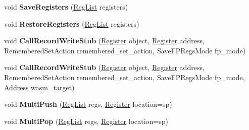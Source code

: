 \begin{DoxyCompactItemize}
\item 
\mbox{\label{classv8_1_1internal_1_1TurboAssembler_adb2676d473b8bdff1c6856758eabfa71}} 
void {\bfseries Save\+Registers} (\mbox{\hyperlink{classuint32__t}{Reg\+List}} registers)
\item 
\mbox{\label{classv8_1_1internal_1_1TurboAssembler_a1ff5e6044d8b7223b66061f3ed4123f1}} 
void {\bfseries Restore\+Registers} (\mbox{\hyperlink{classuint32__t}{Reg\+List}} registers)
\item 
\mbox{\label{classv8_1_1internal_1_1TurboAssembler_ab10280acd4d7aebd053a430cbea68fb1}} 
void {\bfseries Call\+Record\+Write\+Stub} (\mbox{\hyperlink{classv8_1_1internal_1_1Register}{Register}} object, \mbox{\hyperlink{classv8_1_1internal_1_1Register}{Register}} address, Remembered\+Set\+Action remembered\+\_\+set\+\_\+action, Save\+F\+P\+Regs\+Mode fp\+\_\+mode)
\item 
\mbox{\label{classv8_1_1internal_1_1TurboAssembler_a2bc1271b1999cb2ee3784489515931b6}} 
void {\bfseries Call\+Record\+Write\+Stub} (\mbox{\hyperlink{classv8_1_1internal_1_1Register}{Register}} object, \mbox{\hyperlink{classv8_1_1internal_1_1Register}{Register}} address, Remembered\+Set\+Action remembered\+\_\+set\+\_\+action, Save\+F\+P\+Regs\+Mode fp\+\_\+mode, \mbox{\hyperlink{classuintptr__t}{Address}} wasm\+\_\+target)
\item 
\mbox{\label{classv8_1_1internal_1_1TurboAssembler_a9de5c47049739b97a60dd316fb39fed6}} 
void {\bfseries Multi\+Push} (\mbox{\hyperlink{classuint32__t}{Reg\+List}} regs, \mbox{\hyperlink{classv8_1_1internal_1_1Register}{Register}} location=sp)
\item 
\mbox{\label{classv8_1_1internal_1_1TurboAssembler_a8013d77ea3081712f3d2e818a6fb47ed}} 
void {\bfseries Multi\+Pop} (\mbox{\hyperlink{classuint32__t}{Reg\+List}} regs, \mbox{\hyperlink{classv8_1_1internal_1_1Register}{Register}} location=sp)
\item 
\mbox{\label{classv8_1_1internal_1_1TurboAssembler_a0d87a83feaf28c9b8e70c072b61b150c}} 

\end{DoxyCompactItemize}
